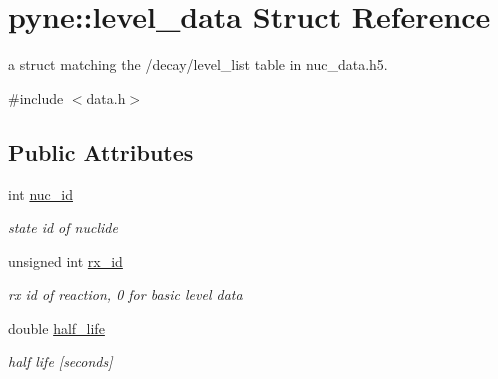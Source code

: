 \hypertarget{structpyne_1_1level__data}{}\section{pyne\+:\+:level\+\_\+data Struct Reference}
\label{structpyne_1_1level__data}


a struct matching the \textquotesingle{}/decay/level\+\_\+list\textquotesingle{} table in nuc\+\_\+data.\+h5.  




{\ttfamily \#include $<$data.\+h$>$}

\subsection*{Public Attributes}
\begin{DoxyCompactItemize}
\item 
\mbox{\label{structpyne_1_1level__data_aefac68a7a5aaedafd0b01f459e75adc8}} 
int \hyperlink{structpyne_1_1level__data_aefac68a7a5aaedafd0b01f459e75adc8}{nuc\+\_\+id}
\begin{DoxyCompactList}\small\item\em state id of nuclide \end{DoxyCompactList}\item 
\mbox{\label{structpyne_1_1level__data_a52a8e7987f8f2a01fe7142bac5ab6adc}} 
unsigned int \hyperlink{structpyne_1_1level__data_a52a8e7987f8f2a01fe7142bac5ab6adc}{rx\+\_\+id}
\begin{DoxyCompactList}\small\item\em rx id of reaction, 0 for basic level data \end{DoxyCompactList}\item 
\mbox{\label{structpyne_1_1level__data_a044daae5c914e096c423b95da1586dc0}} 
double \hyperlink{structpyne_1_1level__data_a044daae5c914e096c423b95da1586dc0}{half\+\_\+life}
\begin{DoxyCompactList}\small\item\em half life \mbox{[}seconds\mbox{]} \end{DoxyCompactList}\item 
\mbox{\label{structpyne_1_1level__data_af029059b5f79cfa2ad22e6f9fcb04ac9}} 

\end{DoxyCompactItemize}
